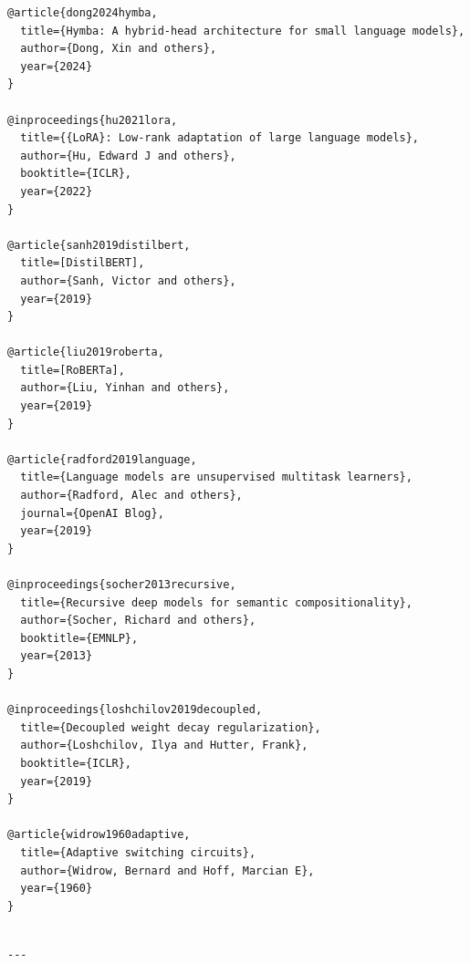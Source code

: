 \begin{lstlisting}
@article{dong2024hymba,
  title={Hymba: A hybrid-head architecture for small language models},
  author={Dong, Xin and others},
  year={2024}
}

@inproceedings{hu2021lora,
  title={{LoRA}: Low-rank adaptation of large language models},
  author={Hu, Edward J and others},
  booktitle={ICLR},
  year={2022}
}

@article{sanh2019distilbert,
  title=[DistilBERT],
  author={Sanh, Victor and others},
  year={2019}
}

@article{liu2019roberta,
  title=[RoBERTa],
  author={Liu, Yinhan and others},
  year={2019}
}

@article{radford2019language,
  title={Language models are unsupervised multitask learners},
  author={Radford, Alec and others},
  journal={OpenAI Blog},
  year={2019}
}

@inproceedings{socher2013recursive,
  title={Recursive deep models for semantic compositionality},
  author={Socher, Richard and others},
  booktitle={EMNLP},
  year={2013}
}

@inproceedings{loshchilov2019decoupled,
  title={Decoupled weight decay regularization},
  author={Loshchilov, Ilya and Hutter, Frank},
  booktitle={ICLR},
  year={2019}
}

@article{widrow1960adaptive,
  title={Adaptive switching circuits},
  author={Widrow, Bernard and Hoff, Marcian E},
  year={1960}
}
\end{lstlisting}
\begin{lstlisting}

---
\end{lstlisting}